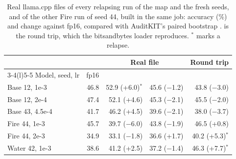\begin{table}[!t]
\centering\footnotesize\setlength{\tabcolsep}{1.8pt}
\begin{tabular}{@{}lrrrr@{}}
\toprule
 & & \multicolumn{2}{c}{Real file} & Round trip \\
\cmidrule(lr){3-4}\cmidrule(l){5-5}
Model, seed, lr & fp16 & \fq{} & \qkm{} & \nf{} \\
\midrule
Base 12, 1e-3 & 46.8 & 52.9 (+6.0)$^{*}$ & 45.6 ($-$1.2) & 43.8 ($-$3.0) \\
Base 12, 2e-4 & 47.4 & 52.1 (+4.6) & 45.3 ($-$2.1) & 45.5 ($-$2.0) \\
Base 43, 4.5e-4 & 41.7 & 46.2 (+4.5) & 39.6 ($-$2.1) & 38.0 ($-$3.7) \\
Fire 44, 1e-3 & 45.7 & 39.7 ($-$6.0) & 43.8 ($-$1.9) & 46.5 (+0.8) \\
Fire 44, 2e-3 & 34.9 & 33.1 ($-$1.8) & 36.6 (+1.7) & 40.2 (+5.3)$^{*}$ \\
Water 42, 1e-3 & 38.6 & 41.2 (+2.5) & 37.2 ($-$1.4) & 46.3 (+7.7)$^{*}$ \\
\bottomrule
\end{tabular}
\caption{Real llama.cpp files of every relapsing run of the map and the fresh seeds, and of the other Fire run of seed 44, built in the same job: \wmdp{} accuracy (\%) and change against fp16, compared with AuditKIT's paired bootstrap \protect\citep{arora2026auditkit}. \nf{} is the round trip, which the bitsandbytes loader reproduces. $^{*}$ marks a relapse.}
\label{tab:real}
\end{table}
